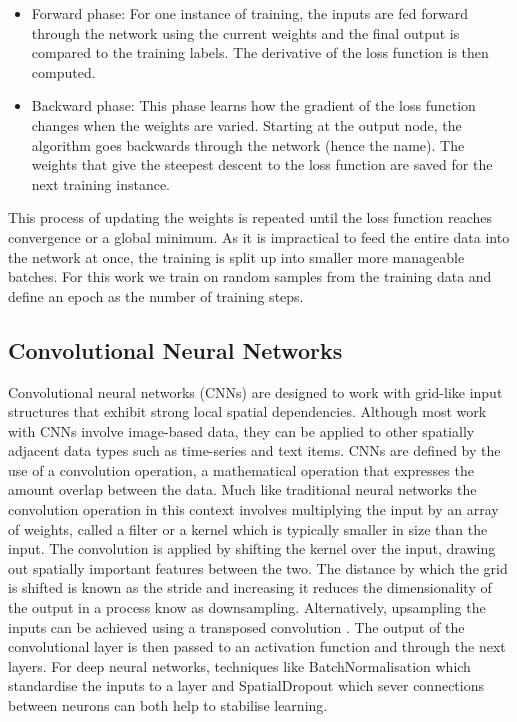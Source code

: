\documentclass[12pt]{iopart}
\begin{document}
\begin{itemize}
\item Forward phase: For one instance of training, the inputs are fed forward through the network using the current weights and the final output is compared to the training labels. The derivative of the loss function is then computed.
\item Backward phase: This phase learns how the gradient of the loss function changes when the weights are varied. Starting at the output node, the algorithm goes backwards through the network (hence the name). The weights that give the steepest descent to the loss function are saved for the next training instance.  
\end{itemize}
This process of updating the weights is repeated until the loss function reaches convergence or a global minimum. As it is impractical to feed the entire data into the network at once, the training is split up into smaller more manageable batches. For this work we train on random samples from the training data and define an epoch as the number of training steps.


\subsection{Convolutional Neural Networks}
%
Convolutional neural networks (CNNs) are designed to work with grid-like input structures that exhibit
strong local spatial dependencies. Although most work with \acp{CNN}
involve image-based data, they can be applied to other spatially adjacent data
types such as time-series and text items. \acp{CNN} are defined by the use of a
convolution operation, a mathematical operation that expresses the amount
overlap between the data. Much like traditional neural networks the convolution operation in this context involves multiplying the input by an array of weights, called a filter or a kernel which is typically smaller in size than the input. The convolution is applied by shifting the kernel over the input, drawing out spatially important features between the
two. The distance by which the grid is shifted is known as
the stride and increasing it reduces the dimensionality of the output in a process know as downsampling. Alternatively, upsampling the inputs can be achieved using a transposed convolution \cite{dumoulin2016guide}. The output of the convolutional layer is then passed to an activation function and through the next layers. For deep neural networks, techniques like BatchNormalisation \cite{ioffe2015batch} which standardise the inputs to a layer and SpatialDropout \cite{tompson2014efficient} which sever connections between neurons can both help to stabilise learning.  
\end{document}
